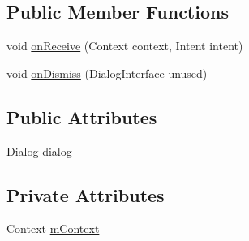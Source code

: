 \subsection*{Public Member Functions}
\begin{DoxyCompactItemize}
\item 
void \hyperlink{classcom_1_1android_1_1server_1_1power_1_1ShutdownThread_1_1CloseDialogReceiver_a6f11c6d2c5343843e5b1194abd48623e}{on\-Receive} (Context context, Intent intent)
\item 
void \hyperlink{classcom_1_1android_1_1server_1_1power_1_1ShutdownThread_1_1CloseDialogReceiver_ae17a10bd92e80ad0961167a1af3ddadb}{on\-Dismiss} (Dialog\-Interface unused)
\end{DoxyCompactItemize}
\subsection*{Public Attributes}
\begin{DoxyCompactItemize}
\item 
Dialog \hyperlink{classcom_1_1android_1_1server_1_1power_1_1ShutdownThread_1_1CloseDialogReceiver_a93b406c3e8b9976aa981ee369846f775}{dialog}
\end{DoxyCompactItemize}
\subsection*{Private Attributes}
\begin{DoxyCompactItemize}
\item 
Context \hyperlink{classcom_1_1android_1_1server_1_1power_1_1ShutdownThread_1_1CloseDialogReceiver_a7f5161219feb6ce136795e9451047daf}{m\-Context}
\end{DoxyCompactItemize}


